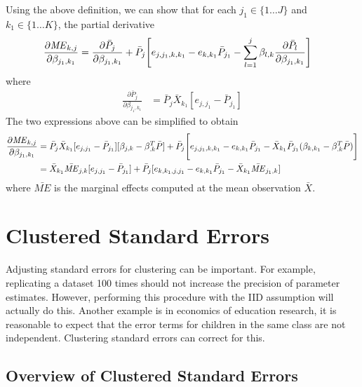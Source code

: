 Using the above definition, we can show that for each $j_1 \in \{ 1 \ldots J \}$ and
$k_1 \in \{1 \ldots K\}$, the partial derivative
\begin{align*}
  \frac{\partial \mathit{ME}_{k,j}}{\partial \beta_{j_1, k_1}} &= \frac{\partial \bar{P}_{j}}{\partial \beta_{j_1, k_1}}
  + \bar{P}_j \Bigg{[} e_{j,j_1,k,k_1} -  e_{k,k_1} \bar{P}_{j_1} -
  \sum_{l=1}^{j} \beta_{l,k} \frac{\partial \bar{P}_l}{\partial \beta_{j_1, k_1}} \Bigg{]}
\end{align*}
where
\begin{align*}
  \frac{\partial \bar{P}_{j}}{\partial \beta_{j_1, k_1}} &= \bar{P}_j \bar{X}_{k_1}
    [e_{j,j_1} - \bar{P}_{j_1}]
\end{align*}
The two expressions above can be simplified to obtain
\begin{align*}
  \frac{\partial \mathit{ME}_{k,j}}{\partial \beta_{j_1, k_1}} &= \bar{P}_j
  \bar{X}_{k_1} [e_{j,j_1} - \bar{P}_{j_1}] [\beta_{j,k} -
  \beta_{. k}^T \bar{P}] + \bar{P}_j \Bigg{[} e_{j,j_1,k,k_1} -
  e_{k,k_1} \bar{P}_{j_1} -
  \bar{X}_{k_1} \bar{P}_{j_1} ( \beta_{k,k_1} - \beta_{. k}^T \bar{P}) \Bigg{]} \\
  &= \bar{X}_{k_1} \bar{\mathit{ME}}_{j,k} [ e_{j,j_1} - \bar{P}_{j_1} ] +
  \bar{P}_j [e_{k,k_1,j,j_1} - e_{k,k_1}\bar{P}_{j_1} - \bar{X}_{k_1}
  \bar{\mathit{ME}}_{j_1,k} ]
\end{align*}
where $\bar{\mathit{ME}}$ is the marginal effects computed at the mean observation $\bar{X}$.



\section{Clustered Standard Errors} %
\label{sec:clustered_standard_errors}
Adjusting standard errors for clustering can be important. For
example, replicating a dataset 100 times should not increase the
precision of parameter estimates. However, performing this procedure
with the IID assumption will actually do this. Another example is in
economics of education research, it is reasonable to expect that the
error terms for children in the same class are not
independent. Clustering standard errors can correct for this.

\subsection{Overview of Clustered Standard Errors}

